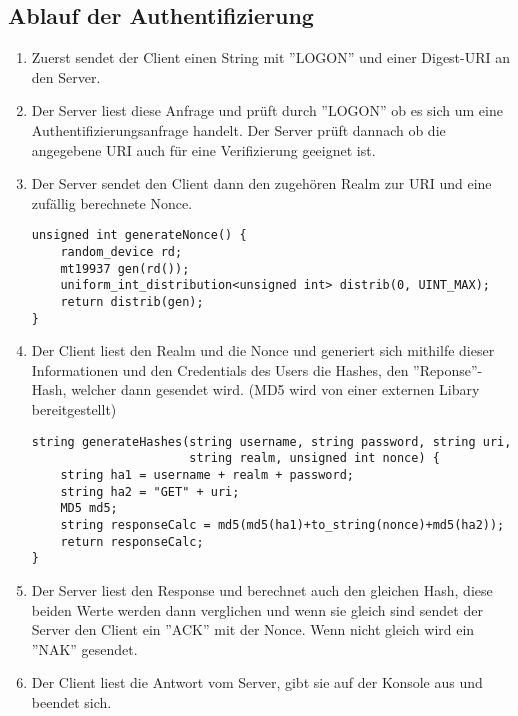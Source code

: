 \documentclass[12pt]{report}
\begin{document}
\subsection{Ablauf der Authentifizierung}
\begin{enumerate}
    \item Zuerst sendet der Client einen String mit ''LOGON'' und einer Digest-URI an den Server.
    \item Der Server liest diese Anfrage und prüft durch ''LOGON'' ob es sich um eine Authentifizierungsanfrage handelt. Der Server prüft dannach ob die angegebene URI auch für eine Verifizierung geeignet ist. 
    \item Der Server sendet den Client dann den zugehören Realm zur URI und eine zufällig berechnete Nonce.
    \begin{verbatim}
unsigned int generateNonce() {
    random_device rd; 
    mt19937 gen(rd()); 
    uniform_int_distribution<unsigned int> distrib(0, UINT_MAX);
    return distrib(gen);
}
    \end{verbatim}
    \item Der Client liest den Realm und die Nonce und generiert sich mithilfe dieser Informationen und den Credentials des Users die Hashes, den ''Reponse''-Hash, welcher dann gesendet wird. (MD5 wird von einer externen Libary bereitgestellt)
    \begin{verbatim}
string generateHashes(string username, string password, string uri, 
                      string realm, unsigned int nonce) {
    string ha1 = username + realm + password;
    string ha2 = "GET" + uri;
    MD5 md5;
    string responseCalc = md5(md5(ha1)+to_string(nonce)+md5(ha2));
    return responseCalc;
}
    \end{verbatim}    
    \item Der Server liest den Response und berechnet auch den gleichen Hash, diese beiden Werte werden dann verglichen und wenn sie gleich sind sendet der Server den Client ein ''ACK'' mit der Nonce. Wenn nicht gleich wird ein ''NAK'' gesendet. 
    \item Der Client liest die Antwort vom Server, gibt sie auf der Konsole aus und beendet sich.
\end{enumerate}
\end{document}
